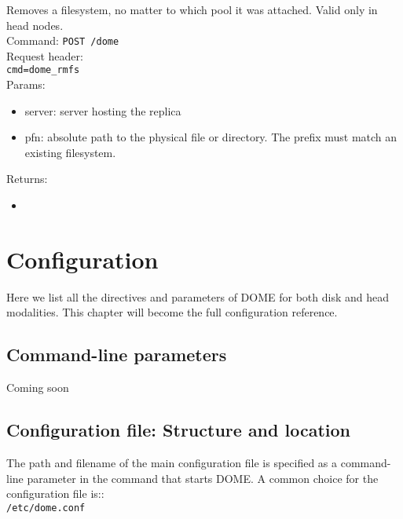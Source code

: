 \documentclass[a4paper,10pt]{scrreprt}
\begin{document}
Removes a filesystem, no matter to which pool it was attached. Valid only in head nodes.\\
Command:
\lstinline"POST /dome"\\
Request header:\\
\lstinline"cmd=dome_rmfs"\\
Params:
\begin{itemize}
 \item server: server hosting the replica
 \item pfn: absolute path to the physical file or directory. The prefix must match an existing filesystem.
\end{itemize}

Returns:
\begin{itemize}
 \item 
\end{itemize}
 
 
 
 
 
 
 
 
 
 
 
 
 
 
 
 
 
 
 
 
\chapter{Configuration}
Here we list all the directives and parameters of DOME for both disk and head modalities. This chapter will become the full configuration reference.\\

\section{Command-line parameters}

Coming soon\\

\section{Configuration file: Structure and location}
The path and filename of the main configuration file is specified as a command-line parameter in the command that starts DOME. A common
choice for the configuration file is::\\

\lstinline"/etc/dome.conf"\\
\end{document}
